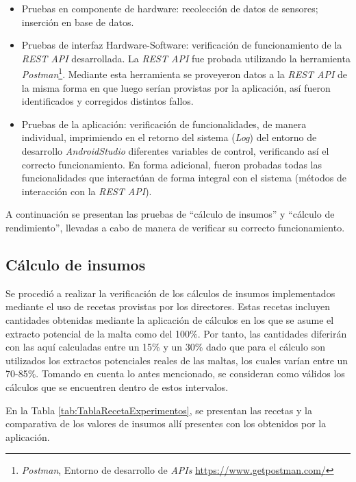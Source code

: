 \begin{itemize}
    \item Pruebas en componente de hardware: recolección de datos de sensores; inserción en base de datos.
    \item Pruebas de interfaz Hardware-Software: verificación de funcionamiento de la \textit{REST API} desarrollada. La \textit{REST API} fue probada utilizando la herramienta \textit{Postman}\footnote{\textit{Postman}, Entorno de desarrollo de \textit{APIs} \url{https://www.getpostman.com/}}. Mediante esta herramienta se proveyeron datos a la \textit{REST API} de la misma forma en que luego serían provistas por la aplicación, así fueron identificados y corregidos distintos fallos.
    \item Pruebas de la aplicación: verificación de funcionalidades, de manera individual, imprimiendo en el retorno del sistema (\textit{Log}) del entorno de desarrollo \textit{AndroidStudio} diferentes variables de control, verificando así el correcto funcionamiento. En forma adicional, fueron probadas todas las funcionalidades que interactúan de forma integral con el sistema (métodos de interacción con la \textit{REST API}).
\end{itemize}

\par A continuación se presentan las pruebas de ``cálculo de insumos'' y ``cálculo de rendimiento'', llevadas a cabo de manera de verificar su correcto funcionamiento.

\subsection{Cálculo de insumos}
\par Se procedió a realizar la verificación de los cálculos de insumos implementados mediante el uso de recetas provistas por los directores. Estas recetas incluyen cantidades obtenidas mediante la aplicación de cálculos en los que se asume el extracto potencial de la malta como del 100\%. Por tanto, las cantidades diferirán con las aquí calculadas entre un 15\% y un 30\% dado que para el cálculo son utilizados los extractos potenciales reales de las maltas, los cuales varían entre un 70-85\%. Tomando en cuenta lo antes mencionado, se consideran como válidos los cálculos que se encuentren dentro de estos intervalos.

\par En la Tabla \ref{tab:TablaRecetaExperimentos}, se presentan las recetas y la comparativa de los valores de insumos allí presentes con los obtenidos por la aplicación.

